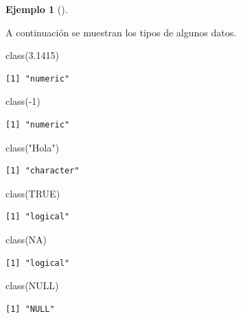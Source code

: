 \documentclass[
  a4paper,
]{scrreport}
\newenvironment{Shaded}{\begin{snugshade}}{\end{snugshade}}
\newcommand{\ConstantTok}[1]{\textcolor[rgb]{0.56,0.35,0.01}{#1}}
\newcommand{\DecValTok}[1]{\textcolor[rgb]{0.68,0.00,0.00}{#1}}
\newcommand{\FloatTok}[1]{\textcolor[rgb]{0.68,0.00,0.00}{#1}}
\newcommand{\FunctionTok}[1]{\textcolor[rgb]{0.28,0.35,0.67}{#1}}
\newcommand{\NormalTok}[1]{\textcolor[rgb]{0.00,0.23,0.31}{#1}}
\newcommand{\SpecialCharTok}[1]{\textcolor[rgb]{0.37,0.37,0.37}{#1}}
\newcommand{\StringTok}[1]{\textcolor[rgb]{0.13,0.47,0.30}{#1}}
\theoremstyle{definition}
\theoremstyle{definition}
\newtheorem{example}{Ejemplo}[chapter]
\theoremstyle{remark}
\begin{document}
\leavevmode{}%
\begin{example}[]\label{exm-tipos-datos}

A continuación se muestran los tipos de algunos datos.

\begin{Shaded}
\begin{Highlighting}[]
\FunctionTok{class}\NormalTok{(}\FloatTok{3.1415}\NormalTok{)}
\end{Highlighting}
\end{Shaded}

\begin{verbatim}
[1] "numeric"
\end{verbatim}

\begin{Shaded}
\begin{Highlighting}[]
\FunctionTok{class}\NormalTok{(}\SpecialCharTok{{-}}\DecValTok{1}\NormalTok{)}
\end{Highlighting}
\end{Shaded}

\begin{verbatim}
[1] "numeric"
\end{verbatim}

\begin{Shaded}
\begin{Highlighting}[]
\FunctionTok{class}\NormalTok{(}\StringTok{"Hola"}\NormalTok{)}
\end{Highlighting}
\end{Shaded}

\begin{verbatim}
[1] "character"
\end{verbatim}

\begin{Shaded}
\begin{Highlighting}[]
\FunctionTok{class}\NormalTok{(}\ConstantTok{TRUE}\NormalTok{)}
\end{Highlighting}
\end{Shaded}

\begin{verbatim}
[1] "logical"
\end{verbatim}

\begin{Shaded}
\begin{Highlighting}[]
\FunctionTok{class}\NormalTok{(}\ConstantTok{NA}\NormalTok{)}
\end{Highlighting}
\end{Shaded}

\begin{verbatim}
[1] "logical"
\end{verbatim}

\begin{Shaded}
\begin{Highlighting}[]
\FunctionTok{class}\NormalTok{(}\ConstantTok{NULL}\NormalTok{)}
\end{Highlighting}
\end{Shaded}

\begin{verbatim}
[1] "NULL"
\end{verbatim}

\end{example}
\end{document}
